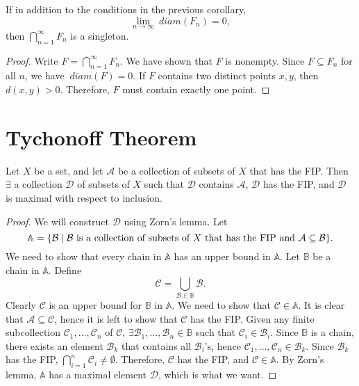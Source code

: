\begin{prop}
    If in addition to the conditions in the previous corollary, 
    \[
    \lim_{n\to\infty} ~diam (F_n) = 0,
    \]
    then $\bigcap_{n=1}^\infty F_n$ is a singleton.
    \begin{proof}
        Write $F = \bigcap_{n=1}^\infty F_n$. We have shown that $F$ is nonempty. Since $F \subseteq F_n$ for all $n$, we have $~diam (F) = 0$. If $F$ contains two distinct points $x, y$, then $d(x, y) > 0$. Therefore, $F$ must contain exactly one point. 
    \end{proof}
\end{prop}

\section{Tychonoff Theorem}

\begin{lm}
    \label{lm:tychonoff-lm1}
    Let $X$ be a set, and let $\mathcal A$ be a collection of subsets of $X$ that has the FIP. Then $\exists$ a collection $\mathcal D$ of subsets of $X$ such that $\mathcal D$ contains $\mathcal A$, $\mathcal D$ has the FIP, and $\mathcal D$ is maximal with respect to inclusion.
    \begin{proof}
        We will construct $\mathcal D$ using Zorn's lemma. Let
        \[
        \mathbb A = {\left\{{\mathcal B \mid \mathcal B \text{ is a collection of subsets of $X$ that has the FIP and } \mathcal A \subseteq \mathcal B}\right\}}.
        \]
        We need to show that every chain in $\mathbb A$ has an upper bound in $\mathbb A$. Let $\mathbb B$ be a chain in $\mathbb A$. Define
        \[
        \mathcal C = \bigcup_{\mathcal B \in \mathbb B} \mathcal B.
        \]
        Clearly $\mathcal C$ is an upper bound for $\mathbb B$ in $\mathbb A$. We need to show that $\mathcal C \in \mathbb A$. It is clear that $\mathcal A \subseteq \mathcal C$, hence it is left to show that $\mathcal C$ has the FIP. Given any finite subcollection $\mathcal C_1, \ldots, \mathcal C_n$ of $\mathcal C$, $\exists \mathcal B_1, \ldots, \mathcal B_n \in \mathbb B$ such that $\mathcal C_i \in \mathcal B_i$. Since $\mathbb B$ is a chain, there exists an element $\mathcal B_k$ that contains all $\mathcal B_i$'s, hence $\mathcal C_1, \ldots, \mathcal C_n \in \mathcal B_k$. Since $\mathcal B_k$ has the FIP, $\bigcap_{i=1}^n \mathcal C_i \neq \emptyset$. Therefore, $\mathcal C$ has the FIP, and $\mathcal C \in \mathbb A$. By Zorn's lemma, $\mathbb A$ has a maximal element $\mathcal D$, which is what we want.
    \end{proof}
\end{lm}

